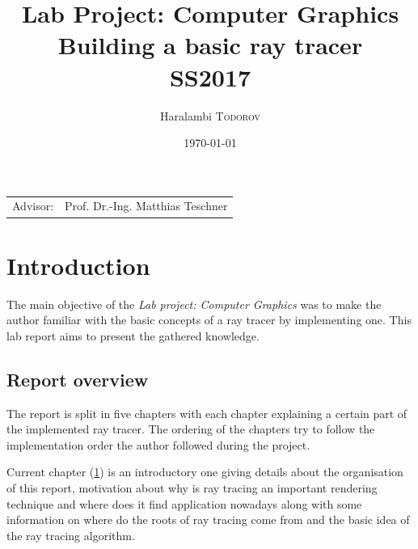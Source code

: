 \documentclass{article}
\title{Lab Project: Computer Graphics \\ Building a basic ray tracer \\ SS2017} %
\author{Haralambi \textsc{Todorov}} %
\date{\today} %
\begin{document}
\maketitle %

\begin{center}
\begin{tabular}{l r}
Advisor: & Prof. Dr.-Ing. Matthias Teschner %
\end{tabular}
\end{center}



\section{Introduction}
\label{sec:intro}
The main objective of the \textit{Lab project: Computer Graphics} was to make the author familiar with the basic concepts of a ray tracer by implementing one. This lab report aims to present the gathered knowledge.

\subsection{Report overview}
The report is split in five chapters with each chapter explaining a certain part of the implemented ray tracer. The ordering of the chapters try to follow the implementation order the author followed during the project. 

\vspace*{\baselineskip}

Current chapter (\ref{sec:intro}) is an introductory one giving details about the organisation of this report, motivation about why is ray tracing an important rendering technique and where does it find application nowadays along with some information on where do the roots of ray tracing come from and the basic idea of the ray tracing algorithm.

\vspace*{\baselineskip}
\end{document}
